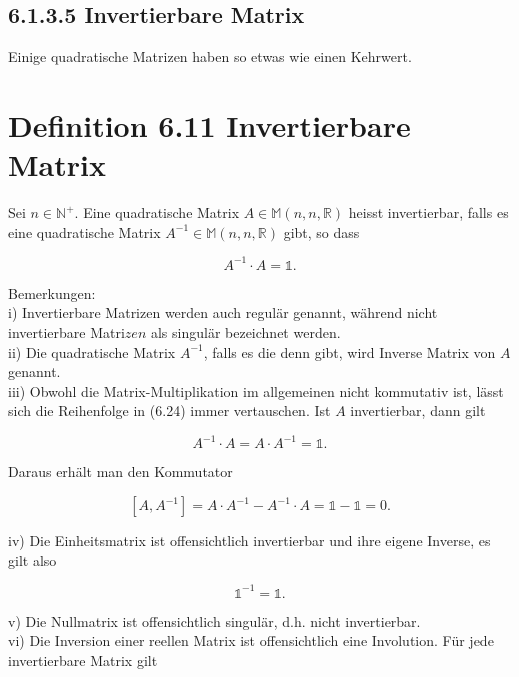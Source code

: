 \documentclass[10pt]{article}
\begin{document}
\subsection*{6.1.3.5 Invertierbare Matrix}
Einige quadratische Matrizen haben so etwas wie einen Kehrwert.

\section*{Definition 6.11 Invertierbare Matrix}
Sei $n \in \mathbb{N}^{+}$. Eine quadratische Matrix $A \in \mathbb{M}(n, n, \mathbb{R})$ heisst invertierbar, falls es eine quadratische Matrix $A^{-1} \in \mathbb{M}(n, n, \mathbb{R})$ gibt, so dass


\begin{equation*}
A^{-1} \cdot A=\mathbb{1} . \tag{6.24}
\end{equation*}


Bemerkungen:\\
i) Invertierbare Matrizen werden auch regulär genannt, während nicht invertierbare Matri$z e n$ als singulär bezeichnet werden.\\
ii) Die quadratische Matrix $A^{-1}$, falls es die denn gibt, wird Inverse Matrix von $A$ genannt.\\
iii) Obwohl die Matrix-Multiplikation im allgemeinen nicht kommutativ ist, lässt sich die Reihenfolge in (6.24) immer vertauschen. Ist $A$ invertierbar, dann gilt


\begin{equation*}
A^{-1} \cdot A=A \cdot A^{-1}=\mathbb{1} . \tag{6.25}
\end{equation*}


Daraus erhält man den Kommutator


\begin{equation*}
\left[A, A^{-1}\right]=A \cdot A^{-1}-A^{-1} \cdot A=\mathbb{1}-\mathbb{1}=0 . \tag{6.26}
\end{equation*}


iv) Die Einheitsmatrix ist offensichtlich invertierbar und ihre eigene Inverse, es gilt also


\begin{equation*}
\mathbb{1}^{-1}=\mathbb{1} . \tag{6.27}
\end{equation*}


v) Die Nullmatrix ist offensichtlich singulär, d.h. nicht invertierbar.\\
vi) Die Inversion einer reellen Matrix ist offensichtlich eine Involution. Für jede invertierbare Matrix gilt
\end{document}
